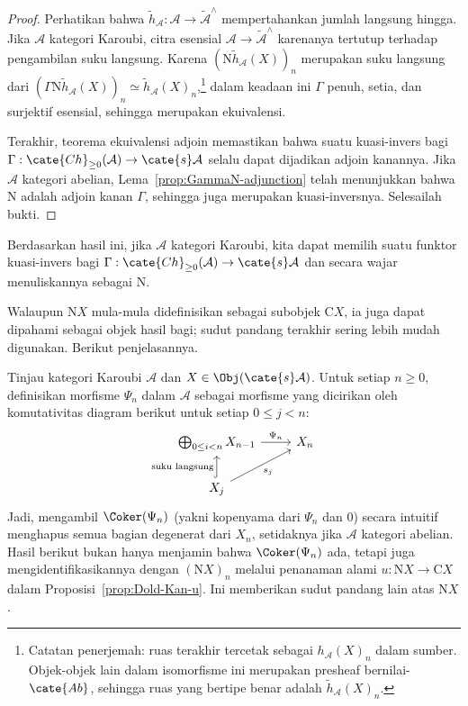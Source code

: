 \begin{proof}
	Perhatikan bahwa
	$\tilde{h}_{\mathcal{A}}:\mathcal{A}\to\tilde{\mathcal{A}}^\wedge$
	mempertahankan jumlah langsung hingga. Jika $\mathcal{A}$ kategori Karoubi,
	citra esensial $\mathcal{A}\to\tilde{\mathcal{A}}^\wedge$ karenanya
	tertutup terhadap pengambilan suku langsung. Karena
	$(\mathrm{N}\tilde{h}_{\mathcal{A}}(X))_n$ merupakan suku langsung dari
	$(\Gamma\mathrm{N}\tilde{h}_{\mathcal{A}}(X))_n\simeq
	\tilde{h}_{\mathcal{A}}(X)_n$,\footnote{Catatan penerjemah: ruas terakhir
	tercetak sebagai $h_{\mathcal{A}}(X)_n$ dalam sumber. Objek-objek lain dalam
	isomorfisme ini merupakan presheaf bernilai-$\cate{Ab}$, sehingga ruas yang
	bertipe benar adalah $\tilde{h}_{\mathcal{A}}(X)_n$.} dalam keadaan ini
	$\Gamma$ penuh, setia, dan surjektif esensial, sehingga merupakan
	ekuivalensi.

	Terakhir, teorema ekuivalensi adjoin \cite[Teorema 2.6.12]{Li1} memastikan
	bahwa suatu kuasi-invers bagi
	$\Gamma:\cate{Ch}_{\geq0}(\mathcal{A})\to\cate{s}\mathcal{A}$ selalu dapat
	dijadikan adjoin kanannya. Jika $\mathcal{A}$ kategori abelian,
	Lema~\ref{prop:GammaN-adjunction} telah menunjukkan bahwa $\mathrm{N}$
	adalah adjoin kanan $\Gamma$, sehingga juga merupakan kuasi-inversnya.
	Selesailah bukti.
\end{proof}

\begin{convention}
	Berdasarkan hasil ini, jika $\mathcal{A}$ kategori Karoubi, kita dapat
	memilih suatu funktor kuasi-invers bagi
	$\Gamma:\cate{Ch}_{\geq0}(\mathcal{A})\to\cate{s}\mathcal{A}$ dan secara
	wajar menuliskannya sebagai $\mathrm{N}$.
\end{convention}

Walaupun $\mathrm{N}X$ mula-mula didefinisikan sebagai subobjek
$\mathrm{C}X$, ia juga dapat dipahami sebagai objek hasil bagi; sudut pandang
terakhir sering lebih mudah digunakan. Berikut penjelasannya.

Tinjau kategori Karoubi $\mathcal{A}$ dan
$X\in\Obj(\cate{s}\mathcal{A})$. Untuk setiap $n\geq0$, definisikan morfisme
$\Psi_n$ dalam $\mathcal{A}$ sebagai morfisme yang dicirikan oleh
komutativitas diagram berikut untuk setiap $0\leq j<n$:
\[\begin{tikzcd}
	\bigoplus_{0 \leq i < n} X_{n-1} \arrow[r, "\Psi_n"] & X_n \\
	X_j \arrow[hookrightarrow, u, "\text{suku langsung}"] \arrow[ru, "{s_j}"'] &
\end{tikzcd}\]
Jadi, mengambil $\Coker(\Psi_n)$ (yakni kopenyama dari $\Psi_n$ dan $0$)
secara intuitif menghapus semua bagian degenerat dari $X_n$, setidaknya
jika $\mathcal{A}$ kategori abelian. Hasil berikut bukan hanya menjamin bahwa
$\Coker(\Psi_n)$ ada, tetapi juga mengidentifikasikannya dengan
$(\mathrm{N}X)_n$ melalui penanaman alami
$u:\mathrm{N}X\to\mathrm{C}X$ dalam Proposisi~\ref{prop:Dold-Kan-u}. Ini
memberikan sudut pandang lain atas $\mathrm{N}X$.

